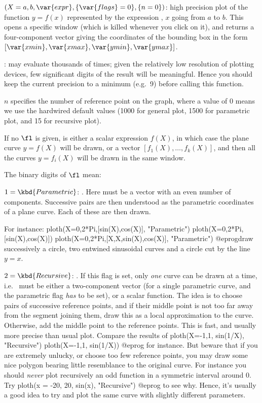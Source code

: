 $(X=a,b,\var{expr},\{\var{flags}=0\},\{n=0\})$: \label{se:ploth}high precision plot of the function $y=f(x)$ represented by the expression
, $x$ going from $a$ to $b$. This opens a specific window (which is
killed whenever you click on it), and returns a four-component vector giving
the coordinates of the bounding box in the form
$[\var{xmin},\var{xmax},\var{ymin},\var{ymax}]$.

:  may evaluate  thousands of
times; given the relatively low resolution of plotting devices, few
significant digits of the result will be meaningful. Hence you should keep
the current precision to a minimum (e.g.~9) before calling this function.

$n$ specifies the number of reference point on the graph, where a value of 0
means we use the hardwired default values (1000 for general plot, 1500 for
parametric plot, and 15 for recursive plot).

If no $\fl$ is given,  is either a scalar expression $f(X)$, in which
case the plane curve $y=f(X)$ will be drawn, or a vector
$[f_1(X),\dots,f_k(X)]$, and then all the curves $y=f_i(X)$ will be drawn in
the same window.

\noindent The binary digits of $\fl$ mean:

\item $1 = \kbd{Parametric}$: . Here  must
be a vector with an even number of components. Successive pairs are then
understood as the parametric coordinates of a plane curve. Each of these are
then drawn.

For instance:
\bprog
ploth(X=0,2*Pi,[sin(X),cos(X)], "Parametric")
ploth(X=0,2*Pi,[sin(X),cos(X)])
ploth(X=0,2*Pi,[X,X,sin(X),cos(X)], "Parametric")
@eprog\noindent draw successively a circle, two entwined sinusoidal curves
and a circle cut by the line $y=x$.

\item $2 = \kbd{Recursive}$: . If this flag is set,
only \emph{one} curve can be drawn at a time, i.e.~ must be either a
two-component vector (for a single parametric curve, and the parametric flag
\emph{has} to be set), or a scalar function. The idea is to choose pairs of
successive reference points, and if their middle point is not too far away
from the segment joining them, draw this as a local approximation to the
curve. Otherwise, add the middle point to the reference points. This is
fast, and usually more precise than usual plot. Compare the results of
\bprog
ploth(X=-1,1, sin(1/X), "Recursive")
ploth(X=-1,1, sin(1/X))
@eprog\noindent
for instance. But beware that if you are extremely unlucky, or choose too few
reference points, you may draw some nice polygon bearing little resemblance
to the original curve. For instance you should \emph{never} plot recursively
an odd function in a symmetric interval around 0. Try
\bprog
ploth(x = -20, 20, sin(x), "Recursive")
@eprog\noindent
to see why. Hence, it's usually a good idea to try and plot the same curve
with slightly different parameters.

